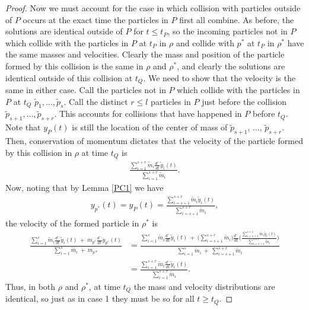\documentclass[11pt]{article}
\numberwithin{equation}{section}
\begin{document}
\begin{proof}
        Now we must account for the case in which collision with particles outside of $P$ occurs at the exact time the particles in $P$ first all combine. As before, the solutions are identical outside of $P$ for $t\le t_P$, so the incoming particles not in $P$ which collide with the particles in $P$ at $t_P$ in $\rho$ and collide with $p^*$ at $t_P$ in $\rho^*$ have the same masses and velocities. Clearly the mass and position of the particle formed by this collision is the same in $\rho$ and $\rho^*$, and clearly the solutions are identical outside of this collision at $t_Q$. We need to show that the velocity is the same in either case. Call the particles not in $P$ which collide with the particles in $P$ at $t_Q$ $\tilde p_{1},\ldots,\tilde p_{s}$. Call the distinct $r\leq l$ particles in $P$ just before the collision $\tilde p_{s+1}, \ldots, \tilde p_{s+r}$. This accounts for collisions that have happened in $P$ before $t_Q$. Note that $y_P(t)$ is still the location of the center of mass of $\tilde{p}_{s+1}$, $\ldots$, $\tilde{p}_{s+r}$. Then, conservation of momentum dictates that the velocity of the particle formed by this collision in $\rho$ at time $t_Q$ is
        \begin{align*}
            \frac{\sum_{i=1}^{s+r}\tilde m_i \frac{d^-}{dt}\tilde y_i(t)}{\sum_{i=1}^{s+r}\tilde m_i}.
        \end{align*}
        Now, noting that by Lemma \ref{PC1} we have
        \begin{align*}
            y_{p^*}(t) = y_P(t)=\frac{\sum_{i=s+1}^{s+r}\tilde m_i \tilde y_i(t)}{\sum_{i=s+1}^{s+r}\tilde m_i},
        \end{align*} 
        the velocity of the formed particle in $\rho^*$ is
        \begin{align*}
            \frac{\sum_{i=1}^{s}\tilde m_i \frac{d^-}{dt}\tilde y_i(t)\ +\ m_{p^*}\frac{d^-}{dt}y_{p^*}(t)}{\sum_{i=1}^{s}\tilde m_i\ +\ m_{p*}}
            &=\frac{\sum_{i=1}^{s}\tilde m_i \frac{d^-}{dt}\tilde y_i(t)\ +\ \Big(\sum_{i=s+1}^{s+r} \tilde m_i\Big)\frac{d^-}{dt}\Bigg(\frac{\sum_{i=s+1}^{s+r}\tilde m_i \tilde y_i(t)}{\sum_{i=s+1}^{s+r}\tilde m_i}\Bigg)}{\sum_{i=1}^{s}\tilde m_i
            \ +\ \sum_{i=s+1}^{s+r}\tilde m_i} 
            \\[1em]
            &=\frac{\sum_{i=1}^{s+r}\tilde m_i \frac{d^-}{dt}\tilde y_i(t)}{\sum_{i=1}^{s+r}\tilde m_i}.
        \end{align*}
    Thus, in both $\rho$ and $\rho^*$, at time $t_Q$ the mass and velocity distributions are identical, so just as in case 1 they must be so for all $t \ge t_Q$.
    \end{proof}
\end{document}
